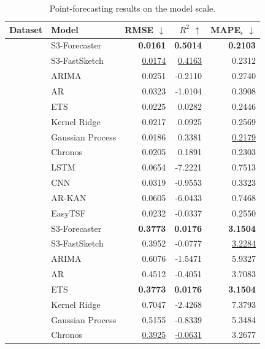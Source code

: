 \begin{table}[p]
\centering
\caption{Point-forecasting results on the model scale.}
\label{tab:point_performance_vertical}
\fontsize{7pt}{7.35pt}\selectfont
\setlength{\tabcolsep}{2.5pt}
\renewcommand{\arraystretch}{0.78}
\begin{tabular}{|>{\centering\arraybackslash}p{1.55cm}|>{\raggedright\arraybackslash}p{2.85cm}|r|r|r|}
\hline
Dataset & Model & RMSE $\downarrow$ & $R^2$ $\uparrow$ & MAPE$_\epsilon$ $\downarrow$ \\
\hline
\multirow{12}{=}{\centering CIF} & S3-Forecaster & \textbf{0.0161} & \textbf{0.5014} & \textbf{0.2103} \\
\cline{2-5}
 & S3-FastSketch & \underline{0.0174} & \underline{0.4163} & 0.2312 \\
\cline{2-5}
 & ARIMA & 0.0251 & -0.2110 & 0.2740 \\
\cline{2-5}
 & AR & 0.0323 & -1.0104 & 0.3908 \\
\cline{2-5}
 & ETS & 0.0225 & 0.0282 & 0.2446 \\
\cline{2-5}
 & Kernel Ridge & 0.0217 & 0.0925 & 0.2569 \\
\cline{2-5}
 & Gaussian Process & 0.0186 & 0.3381 & \underline{0.2179} \\
\cline{2-5}
 & Chronos & 0.0205 & 0.1891 & 0.2303 \\
\cline{2-5}
 & LSTM & 0.0654 & -7.2221 & 0.7513 \\
\cline{2-5}
 & CNN & 0.0319 & -0.9553 & 0.3323 \\
\cline{2-5}
 & AR-KAN & 0.0605 & -6.0433 & 0.7468 \\
\cline{2-5}
 & EasyTSF & 0.0232 & -0.0337 & 0.2550 \\
\hline
\multirow{12}{=}{\centering M3} & S3-Forecaster & \textbf{0.3773} & \textbf{0.0176} & \textbf{3.1504} \\
\cline{2-5}
 & S3-FastSketch & 0.3952 & -0.0777 & \underline{3.2284} \\
\cline{2-5}
 & ARIMA & 0.6076 & -1.5471 & 5.9327 \\
\cline{2-5}
 & AR & 0.4512 & -0.4051 & 3.7083 \\
\cline{2-5}
 & ETS & \textbf{0.3773} & \textbf{0.0176} & \textbf{3.1504} \\
\cline{2-5}
 & Kernel Ridge & 0.7047 & -2.4268 & 7.3793 \\
\cline{2-5}
 & Gaussian Process & 0.5155 & -0.8339 & 5.3484 \\
\cline{2-5}
 & Chronos & \underline{0.3925} & \underline{-0.0631} & 3.2677 \\

\end{tabular}
\end{table}
